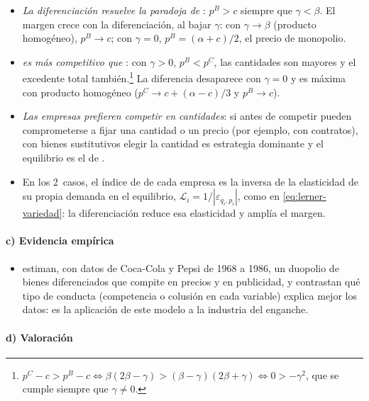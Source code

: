 \documentclass[11pt]{article}
\begin{document}
\begin{itemize}
\item \emph{La diferenciación resuelve la paradoja de }: $p^B>c$ siempre que $\gamma<\beta$. El margen crece con la diferenciación, al bajar $\gamma$: con $\gamma\to\beta$ (producto homogéneo), $p^B\to c$; con $\gamma=0$, $p^B=(\alpha+c)/2$, el precio de monopolio.
\item \emph{ es más competitivo que }: con $\gamma>0$, $p^B<p^C$, las cantidades son mayores y el excedente total también\nocite{SinghVives1984Price}.\footnote{$p^C-c>p^B-c\iff\beta(2\beta-\gamma)>(\beta-\gamma)(2\beta+\gamma)\iff 0>-\gamma^2$, que se cumple siempre que $\gamma\neq0$.} La diferencia desaparece con $\gamma=0$ y es máxima con producto homogéneo ($p^C\to c+(\alpha-c)/3$ y $p^B\to c$).
\item \emph{Las empresas prefieren competir en cantidades}: si antes de competir pueden comprometerse a fijar una cantidad o un precio (por ejemplo, con contratos), con bienes sustitutivos elegir la cantidad es estrategia dominante y el equilibrio es el de \nocite{SinghVives1984Price}.
\item En los 2~casos, el índice de  de cada empresa es la inversa de la elasticidad de su propia demanda en el equilibrio, $\mathcal{L}_i=1/|\varepsilon_{q_i,p_i}|$, como en \eqref{eq:lerner-variedad}: la diferenciación reduce esa elasticidad y amplía el margen.
\end{itemize}

\paragraph{c) Evidencia empírica}

\begin{itemize}
\item \textcite{GasmiLaffontVuong1992Econometric} estiman, con datos de Coca-Cola y Pepsi de 1968 a 1986, un duopolio de bienes diferenciados que compite en precios y en publicidad, y contrastan qué tipo de conducta (competencia o colusión en cada variable) explica mejor los datos: es la aplicación de este modelo a la industria del enganche.
\end{itemize}

\paragraph{d) Valoración}
\end{document}
